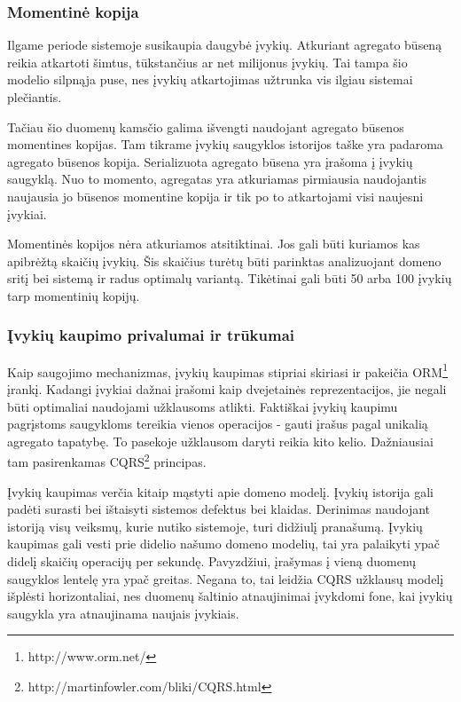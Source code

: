 \subsubsection{Momentinė kopija}

Ilgame periode sistemoje susikaupia daugybė įvykių. Atkuriant agregato būseną reikia atkartoti šimtus, tūkstančius ar net milijonus įvykių. Tai tampa šio modelio silpnąja puse, nes įvykių atkartojimas užtrunka vis ilgiau sistemai plečiantis.

Tačiau šio duomenų kamsčio galima išvengti naudojant agregato būsenos momentines kopijas. Tam tikrame įvykių saugyklos istorijos taške yra padaroma agregato būsenos kopija. Serializuota agregato būsena yra įrašoma į įvykių saugyklą. Nuo to momento, agregatas yra atkuriamas pirmiausia naudojantis naujausia jo būsenos momentine kopija ir tik po to atkartojami visi naujesni įvykiai.

Momentinės kopijos nėra atkuriamos atsitiktinai. Jos gali būti kuriamos kas apibrėžtą skaičių įvykių. Šis skaičius turėtų būti parinktas analizuojant domeno sritį bei sistemą ir radus optimalų variantą. Tikėtinai gali būti 50 arba 100 įvykių tarp momentinių kopijų.

\subsubsection{Įvykių kaupimo privalumai ir trūkumai}

Kaip saugojimo mechanizmas, įvykių kaupimas stipriai skiriasi ir pakeičia ORM\footnote{http://www.orm.net/} įrankį. Kadangi įvykiai dažnai įrašomi kaip dvejetainės reprezentacijos, jie negali būti optimaliai naudojami užklausoms atlikti. Faktiškai įvykių kaupimu pagrįstoms saugykloms tereikia vienos operacijos - gauti įrašus pagal unikalią agregato tapatybę. To pasekoje užklausom daryti reikia kito kelio. Dažniausiai tam pasirenkamas CQRS\footnote{http://martinfowler.com/bliki/CQRS.html} principas. 

Įvykių kaupimas verčia kitaip mąstyti apie domeno modelį. Įvykių istorija gali padėti surasti bei ištaisyti sistemos defektus bei klaidas. Derinimas naudojant istoriją visų veiksmų, kurie nutiko sistemoje, turi didžiulį pranašumą. Įvykių kaupimas gali vesti prie didelio našumo domeno modelių, tai yra palaikyti ypač didelį skaičių operacijų per sekundę. Pavyzdžiui, įrašymas į vieną duomenų saugyklos lentelę yra ypač greitas. Negana to, tai leidžia CQRS užklausų modelį išplėsti horizontaliai, nes duomenų šaltinio atnaujinimai įvykdomi fone, kai įvykių saugykla yra atnaujinama naujais įvykiais.

